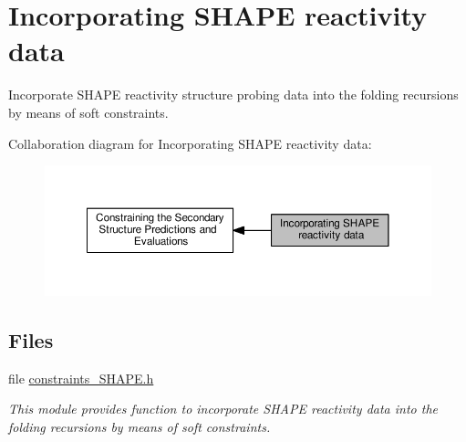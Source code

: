 \hypertarget{group__SHAPE__reactivities}{}\section{Incorporating S\+H\+A\+PE reactivity data}
\label{group__SHAPE__reactivities}


Incorporate S\+H\+A\+PE reactivity structure probing data into the folding recursions by means of soft constraints.  


Collaboration diagram for Incorporating S\+H\+A\+PE reactivity data\+:
\nopagebreak
\begin{figure}[H]
\begin{center}
\leavevmode
\includegraphics[width=350pt]{group__SHAPE__reactivities}
\end{center}
\end{figure}
\subsection*{Files}
\begin{DoxyCompactItemize}
\item 
file \hyperlink{constraints__SHAPE_8h}{constraints\+\_\+\+S\+H\+A\+P\+E.\+h}
\begin{DoxyCompactList}\small\item\em This module provides function to incorporate S\+H\+A\+PE reactivity data into the folding recursions by means of soft constraints. \end{DoxyCompactList}\end{DoxyCompactItemize}
